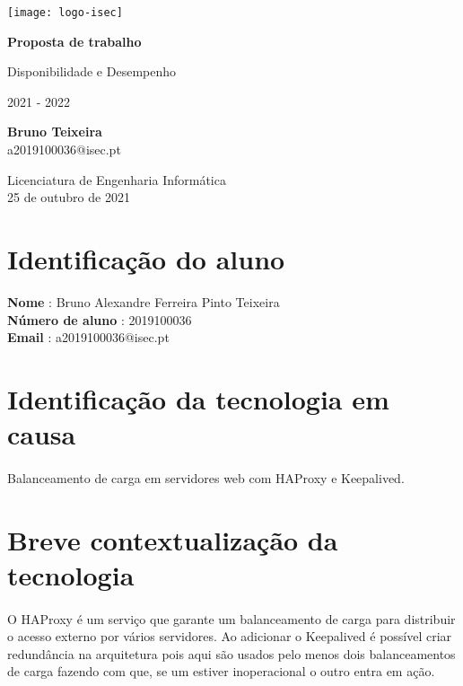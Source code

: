 \documentclass{article}
\begin{document}
	\begin{titlepage}
    	\begin{center}
    		\texttt{[image: logo-isec]}
    		
    		\vspace*{\fill}
    		
    		\Huge
    		\textbf{Proposta de trabalho}
    		
    		\huge
    		Disponibilidade e Desempenho
    		
    		\vspace{0.5cm}
    		\LARGE
    		2021 - 2022
    		
    		\vspace{1.5cm}
    		
    		\textbf{Bruno Teixeira}\\
                a2019100036@isec.pt
    		
    		\vfill
    		\vspace*{\fill}
    		
    		\normalsize
    		Licenciatura de Engenharia Informática \\
    		25 de outubro de 2021
    	\end{center}
    \end{titlepage}


\section{Identificação do aluno}      
\textbf{Nome} : Bruno Alexandre Ferreira Pinto Teixeira \\
\textbf{Número de aluno} : 2019100036 \\
\textbf{Email} : a2019100036@isec.pt

\section{Identificação da tecnologia em causa}
\paragraph{}
Balanceamento de carga em servidores web com HAProxy e Keepalived.

\section{Breve contextualização da tecnologia}
\paragraph{}
O HAProxy é um serviço que garante um balanceamento de carga para distribuir o acesso externo por vários servidores. Ao adicionar o Keepalived é possível criar redundância na arquitetura pois aqui são usados pelo menos dois balanceamentos de carga fazendo com que, se um estiver inoperacional o outro entra em ação.
\end{document}
